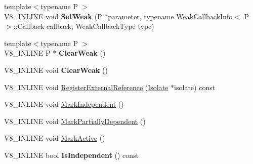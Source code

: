 \begin{DoxyCompactItemize}
\item 
{\footnotesize template$<$typename P $>$ }\\V8\+\_\+\+I\+N\+L\+I\+NE void {\bfseries Set\+Weak} (P $\ast$parameter, typename \hyperlink{classv8_1_1WeakCallbackInfo}{Weak\+Callback\+Info}$<$ P $>$\+::Callback callback, Weak\+Callback\+Type type)\hypertarget{classv8_1_1PersistentBase_aebb8a2c97e219102f613ff3749c956f6}{}\label{classv8_1_1PersistentBase_aebb8a2c97e219102f613ff3749c956f6}

\item 
{\footnotesize template$<$typename P $>$ }\\V8\+\_\+\+I\+N\+L\+I\+NE P $\ast$ {\bfseries Clear\+Weak} ()\hypertarget{classv8_1_1PersistentBase_a444d27c00650e3663348024df08cb121}{}\label{classv8_1_1PersistentBase_a444d27c00650e3663348024df08cb121}

\item 
V8\+\_\+\+I\+N\+L\+I\+NE void {\bfseries Clear\+Weak} ()\hypertarget{classv8_1_1PersistentBase_afe515daead108cceb1699b54051df13b}{}\label{classv8_1_1PersistentBase_afe515daead108cceb1699b54051df13b}

\item 
V8\+\_\+\+I\+N\+L\+I\+NE void \hyperlink{classv8_1_1PersistentBase_a14c051e0080bbe7fbe02be35865b9923}{Register\+External\+Reference} (\hyperlink{classv8_1_1Isolate}{Isolate} $\ast$isolate) const 
\item 
V8\+\_\+\+I\+N\+L\+I\+NE void \hyperlink{classv8_1_1PersistentBase_aed12b0a54bc5ade1fb44e3bdb3a1fe74}{Mark\+Independent} ()
\item 
V8\+\_\+\+I\+N\+L\+I\+NE void \hyperlink{classv8_1_1PersistentBase_a4a876d30dda0dfb812e82bb240e4686e}{Mark\+Partially\+Dependent} ()
\item 
V8\+\_\+\+I\+N\+L\+I\+NE void \hyperlink{classv8_1_1PersistentBase_a7244edd33a45b7d95e566fce85e3f87d}{Mark\+Active} ()
\item 
V8\+\_\+\+I\+N\+L\+I\+NE bool {\bfseries Is\+Independent} () const \hypertarget{classv8_1_1PersistentBase_a2ed93b6be1b27c299906935ef35d2114}{}\label{classv8_1_1PersistentBase_a2ed93b6be1b27c299906935ef35d2114}


\end{DoxyCompactItemize}
